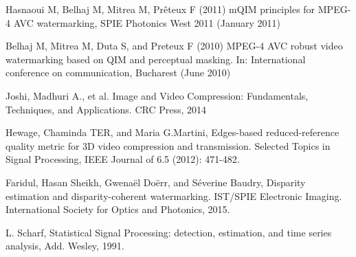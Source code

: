 \begin{thebibliography}{99}
Hasnaoui M, Belhaj M, Mitrea M, Prêteux F (2011) mQIM principles for MPEG-4 AVC watermarking, SPIE Photonics West 2011 (January 2011)

Belhaj M, Mitrea M, Duta S, and Preteux F (2010) MPEG-4 AVC robust video watermarking based on QIM and perceptual masking. In: International conference on communication, Bucharest (June 2010)

Joshi, Madhuri A., et al. Image and Video Compression: Fundamentals, Techniques, and Applications. CRC Press, 2014

 Hewage, Chaminda TER, and Maria G.Martini, Edges-based reduced-reference quality metric for 3D video compression and transmission. Selected Topics in Signal Processing, IEEE Journal of 6.5 (2012): 471-482.



Faridul, Hasan Sheikh, Gwenaël Doërr, and Séverine Baudry, Disparity estimation and disparity-coherent watermarking. IST/SPIE Electronic Imaging. International Society for Optics and Photonics, 2015.


L. Scharf, Statistical Signal Processing: detection,
estimation, and time series analysis, Add. Wesley,
1991.






\end{thebibliography}
\clearpage
\thispagestyle{empty}